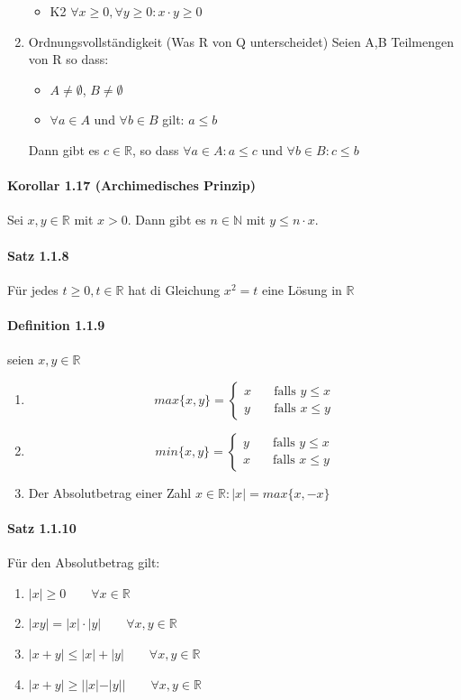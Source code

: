 \documentclass[8pt]{extreport}
\begin{document}
\begin{enumerate}
\begin{itemize}
\item K2 $\forall x \geq 0, \forall y \geq 0: x\cdot y\geq 0$
\end{itemize}
\item Ordnungsvollständigkeit (Was R von Q unterscheidet) Seien A,B Teilmengen von R so dass:
\begin{itemize}
\item $A \neq \emptyset$, $B\neq \emptyset$
\item $\forall a \in A$ und $\forall b \in B$ gilt: $a\leq b$
\end{itemize}
Dann gibt es $c\in \mathbb{R}$, so dass $\forall a \in A: a\leq c$ und $\forall b \in B : c\leq b$
\end{enumerate}
\paragraph{Korollar 1.17 (Archimedisches Prinzip)} Sei $x,y\in \mathbb{R}$ mit $x>0$. Dann gibt es $n\in \mathbb{N}$ mit $y\leq n\cdot x$.
\paragraph{Satz 1.1.8} Für jedes $t\geq 0, t\in \mathbb{R}$ hat di Gleichung $x^2 = t$ eine Lösung in $\mathbb{R}$
\paragraph{Definition 1.1.9} seien $x,y \in \mathbb{R}$
\begin{enumerate}
\item\[ max\{x,y\} =
  \begin{cases}
    x       & \quad \text{falls } y\leq x\\
    y  & \quad \text{falls } x\leq y
  \end{cases}
\]
\item\[ min\{x,y\} =
  \begin{cases}
    y       & \quad \text{falls } y\leq x\\
    x  & \quad \text{falls } x\leq y
  \end{cases}
\]
\item Der Absolutbetrag einer Zahl $x\in \mathbb{R}: |x| = max\{x,-x\}$
\end{enumerate}
\paragraph{Satz 1.1.10} Für den Absolutbetrag gilt:
\begin{enumerate}
\item $|x| \geq 0 \qquad \forall x\in \mathbb{R}$
\item $|xy| = |x|\cdot|y| \qquad \forall x,y \in \mathbb{R}$
\item $|x +y| \leq |x| + |y| \qquad \forall x,y \in \mathbb{R}$
\item $|x+y| \geq ||x| -|y|| \qquad \forall x,y \in \mathbb{R}$
\end{enumerate}
\end{document}
